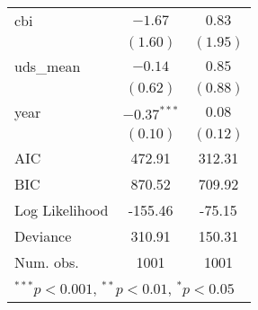 \begin{tabular}{l c c }
cbi                             & $-1.67$        & $0.83$      \\
                                & $(1.60)$       & $(1.95)$    \\
uds\_mean                       & $-0.14$        & $0.85$      \\
                                & $(0.62)$       & $(0.88)$    \\
year                            & $-0.37^{***}$  & $0.08$      \\
                                & $(0.10)$       & $(0.12)$    \\
\hline
AIC                             & 472.91         & 312.31      \\
BIC                             & 870.52         & 709.92      \\
Log Likelihood                  & -155.46        & -75.15      \\
Deviance                        & 310.91         & 150.31      \\
Num. obs.                       & 1001           & 1001        \\
\hline
\multicolumn{3}{l}{\scriptsize{$^{***}p<0.001$, $^{**}p<0.01$, $^*p<0.05$}}
\end{tabular}

